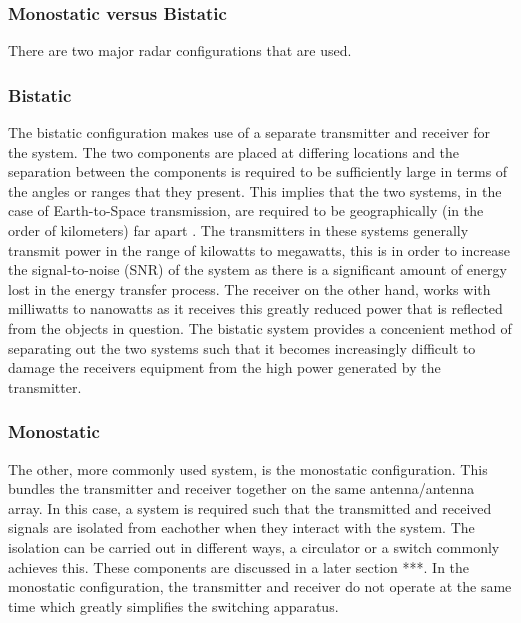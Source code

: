 \documentclass[11pt]{witseiepaper}
\begin{document}
\subsubsection{Monostatic versus Bistatic} \label{sec:MonostaticvsBistatic}

There are two major radar configurations that are used. 

\subsubsection{Bistatic} \label{sec:Bistatic}

The bistatic configuration makes use of a separate transmitter and receiver for the system. The two components are placed at differing locations and the separation between the components is required to be sufficiently large in terms of the angles or ranges that they present.
This implies that the two systems, in the case of Earth-to-Space transmission, are required to be geographically (in the order of kilometers) far apart \cite{bistaticNato}.
The transmitters in these systems generally transmit power in the range of kilowatts to megawatts, this is in order to increase the signal-to-noise (SNR) of the system as there is a significant amount of energy lost in the energy transfer process. The receiver on the other hand, works with milliwatts to nanowatts as it receives this greatly reduced power that is reflected from the objects in question. The bistatic system provides a concenient method of separating out the two systems such that it becomes increasingly difficult to damage the receivers equipment from the high power generated by the transmitter.

\subsubsection{Monostatic} \label{sec:Monostatic}

The other, more commonly used system, is the monostatic configuration. This bundles the transmitter and receiver together on the same antenna/antenna array. In this case, a system is required such that the transmitted and received signals are isolated from eachother when they interact with the system. The isolation can be carried out in different ways, a circulator or a switch commonly achieves this. These components are discussed in a later section ***. In the monostatic configuration, the transmitter and receiver do not operate at the same time which greatly simplifies the switching apparatus.
\end{document}
